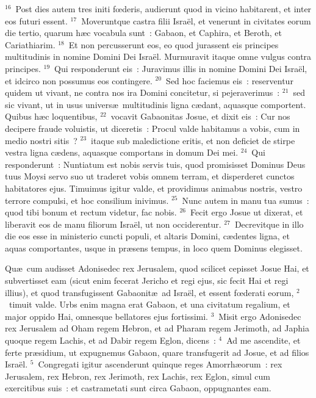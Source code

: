 ${}^{16}$~Post dies autem tres initi fœderis, audierunt quod in vicino habitarent, et inter eos futuri essent.
${}^{17}$~Moveruntque castra filii Isra\"el, et venerunt in civitates eorum die tertio, quarum h\ae c vocabula sunt~: Gabaon, et Caphira, et Beroth, et Cariathiarim.
${}^{18}$~Et non percusserunt eos, eo quod jurassent eis principes multitudinis in nomine Domini Dei Isra\"el. Murmuravit itaque omne vulgus contra principes.
${}^{19}$~Qui responderunt eis~: Juravimus illis in nomine Domini Dei Isra\"el, et idcirco non possumus eos contingere.
${}^{20}$~Sed hoc faciemus eis~: reserventur quidem ut vivant, ne contra nos ira Domini concitetur, si pejeraverimus~:
${}^{21}$~sed sic vivant, ut in usus univers\ae\ multitudinis ligna c\ae dant, aquasque comportent. Quibus h\ae c loquentibus,
${}^{22}$~vocavit Gabaonitas Josue, et dixit eis~: Cur nos decipere fraude voluistis, ut diceretis~: Procul valde habitamus a vobis, cum in medio nostri sitis~?
${}^{23}$~itaque sub maledictione eritis, et non deficiet de stirpe vestra ligna c\ae dens, aquasque comportans in domum Dei mei.
${}^{24}$~Qui responderunt~: Nuntiatum est nobis servis tuis, quod promisisset Dominus Deus tuus Moysi servo suo ut traderet vobis omnem terram, et disperderet cunctos habitatores ejus. Timuimus igitur valde, et providimus animabus nostris, vestro terrore compulsi, et hoc consilium inivimus.
${}^{25}$~Nunc autem in manu tua sumus~: quod tibi bonum et rectum videtur, fac nobis.
${}^{26}$~Fecit ergo Josue ut dixerat, et liberavit eos de manu filiorum Isra\"el, ut non occiderentur.
${}^{27}$~Decrevitque in illo die eos esse in ministerio cuncti populi, et altaris Domini, c\ae dentes ligna, et aquas comportantes, usque in pr\ae sens tempus, in loco quem Dominus elegisset.

\lettrine[lines=3,image=true,loversize=0.05,lraise=-0.03]{Q}{}u\ae\ cum audisset Adonisedec rex Jerusalem, quod scilicet cepisset Josue Hai, et subvertisset eam (sicut enim fecerat Jericho et regi ejus, sic fecit Hai et regi illius), et quod transfugissent Gabaonit\ae\ ad Isra\"el, et essent fœderati eorum,
${}^{2}$~timuit valde. Urbs enim magna erat Gabaon, et una civitatum regalium, et major oppido Hai, omnesque bellatores ejus fortissimi.
${}^{3}$~Misit ergo Adonisedec rex Jerusalem ad Oham regem Hebron, et ad Pharam regem Jerimoth, ad Japhia quoque regem Lachis, et ad Dabir regem Eglon, dicens~:
${}^{4}$~Ad me ascendite, et ferte pr\ae sidium, ut expugnemus Gabaon, quare transfugerit ad Josue, et ad filios Isra\"el.
${}^{5}$~Congregati igitur ascenderunt quinque reges Amorrh\ae orum~: rex Jerusalem, rex Hebron, rex Jerimoth, rex Lachis, rex Eglon, simul cum exercitibus suis~: et castrametati sunt circa Gabaon, oppugnantes eam.


